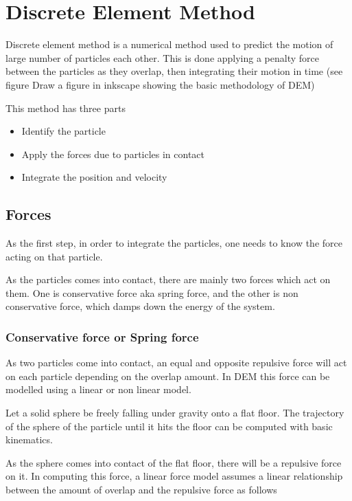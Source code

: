 \chapter{Discrete Element Method}


Discrete element method is a numerical method used to predict the
motion of large number of particles each other. This is done applying
a penalty force between the particles as they overlap, then
integrating their motion in time (see figure Draw a figure in inkscape
showing the basic methodology of DEM)

This method has three parts
\begin{itemize}
\item Identify the particle
\item Apply the forces due to particles in contact
\item Integrate the position and velocity
\end{itemize}


\section{Forces}
\label{sec:forces}

As the first step, in order to integrate the particles, one needs to
know the force acting on that particle.

As the particles comes into contact, there are mainly two forces which
act on them.  One is conservative force aka spring force, and the
other is non conservative force, which damps down the energy of the
system.


\subsection{Conservative force or Spring force}

As two particles come into contact, an equal and opposite repulsive
force will act on each particle depending on the overlap amount. In
DEM this force can be modelled using a linear or non linear model.


Let a solid sphere be freely falling under gravity onto a flat floor.
The trajectory of the sphere of the particle until it hits the floor
can be computed with basic kinematics.

As the sphere comes into contact of the flat floor, there will be a
repulsive force on it. In computing this force, a linear force model
assumes a linear relationship between the amount of overlap and the
repulsive force as follows



